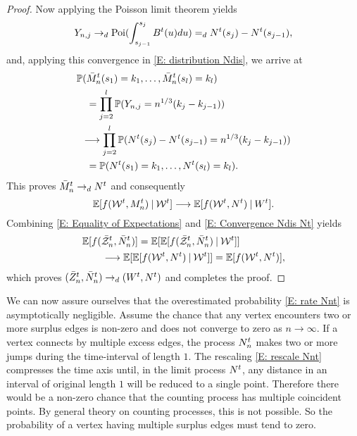 \begin{proof}
Now applying the Poisson limit theorem yields
\begin{equation} \label{E: convergence dist Yj}
Y_{n,j} \rightarrow_d \operatorname*{Poi}( \int_{s_{j-1}}^{s_j} B^t(u)du ) =_d N^t(s_j) - N^t(s_{j-1}),
\end{equation}
and, applying this convergence in \eqref{E: distribution Ndis}, we arrive at
\begin{equation*}
\begin{aligned}
&\mathbb{P}(\bar{M}_n^t(s_1) = k_1, \dots, \bar{M}_n^t(s_l) = k_l) \\
&\quad = \prod_{j=2}^{l} \mathbb{P}( Y_{n,j} = n^{1 / 3}(k_j - k_{j-1}) ) \\
&\enspace \longrightarrow \prod_{j=2}^{l} \mathbb{P}( N^t(s_j) - N^t(s_{j-1}) = n^{1 / 3}(k_j - k_{j-1}) ) \\
&\quad = \mathbb{P}(N^t(s_1) = k_1, \dots, N^t(s_l) = k_l).
\end{aligned}
\end{equation*}
This proves $\bar{M}_n^t \rightarrow_d N^t$ and consequently
\begin{equation} \label{E: Convergence Ndis Nt}
	\mathbb{E}[f(\mathcal{W}^t, M_n^t) \: | \: \mathcal{W}^t] \longrightarrow \mathbb{E}[f(\mathcal{W}^t, N^t) \: | \: W^t].
\end{equation}
Combining \eqref{E: Equality of Expectations} and \eqref{E: Convergence Ndis Nt} yields
\begin{equation}
\begin{aligned}
&\mathbb{E}[f(\bar{\mathcal{Z}}^t_n, \bar{N}_n^t)] = \mathbb{E}[\mathbb{E}[f(\bar{\mathcal{Z}}^t_n, \bar{N}_n^t) \: | \: \mathcal{W}^t]] \\
&\qquad \longrightarrow \mathbb{E}[\mathbb{E}[f(\mathcal{W}^t, N^t) \: | \: \mathcal{W}^t]] = \mathbb{E}[f(\mathcal{W}^t, N^t)],
\end{aligned}
\end{equation}
which proves $(\bar{Z}^t_n, \bar{N}_n^t) \rightarrow_d (W^t, N^t)$ and completes the proof.
\end{proof}


We can now assure ourselves that the overestimated probability \eqref{E: rate Nnt} is asymptotically negligible.
Assume the chance that any vertex encounters two or more surplus edges is non-zero and does not converge to zero as $n \rightarrow \infty$.
If a vertex connects by multiple excess edges, the process $N_n^t$ makes two or more jumps during the time-interval of length $1$.
The rescaling \eqref{E: rescale Nnt} compresses the time axis until, in the limit process $N^t$, 
any distance in an interval of original length $1$ will be reduced to a single point.
Therefore there would be a non-zero chance that the counting process has multiple coincident points.
By general theory on counting processes, this is not possible.
So the probability of a vertex having multiple surplus edges must tend to zero.


\newpage














